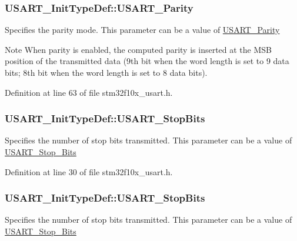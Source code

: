 \subsubsection[{\texorpdfstring{U\+S\+A\+R\+T\+\_\+\+Parity}{USART_Parity}}]{ U\+S\+A\+R\+T\+\_\+\+Init\+Type\+Def\+::\+U\+S\+A\+R\+T\+\_\+\+Parity}\hypertarget{struct_u_s_a_r_t___init_type_def_a5ae66aba755bac37c5cf0dfbf529e2ed}{}\label{struct_u_s_a_r_t___init_type_def_a5ae66aba755bac37c5cf0dfbf529e2ed}
Specifies the parity mode. This parameter can be a value of \hyperlink{group___u_s_a_r_t___parity}{U\+S\+A\+R\+T\+\_\+\+Parity} \begin{DoxyNote}{Note}
When parity is enabled, the computed parity is inserted at the M\+SB position of the transmitted data (9th bit when the word length is set to 9 data bits; 8th bit when the word length is set to 8 data bits). 
\end{DoxyNote}


Definition at line 63 of file stm32f10x\+\_\+usart.\+h.

\subsubsection[{\texorpdfstring{U\+S\+A\+R\+T\+\_\+\+Stop\+Bits}{USART_StopBits}}]{ U\+S\+A\+R\+T\+\_\+\+Init\+Type\+Def\+::\+U\+S\+A\+R\+T\+\_\+\+Stop\+Bits}\hypertarget{struct_u_s_a_r_t___init_type_def_af665896ffd0234704ff30fc4df61565f}{}\label{struct_u_s_a_r_t___init_type_def_af665896ffd0234704ff30fc4df61565f}
Specifies the number of stop bits transmitted. This parameter can be a value of \hyperlink{group___u_s_a_r_t___stop___bits}{U\+S\+A\+R\+T\+\_\+\+Stop\+\_\+\+Bits} 

Definition at line 30 of file stm32f10x\+\_\+usart.\+h.

\subsubsection[{\texorpdfstring{U\+S\+A\+R\+T\+\_\+\+Stop\+Bits}{USART_StopBits}}]{ U\+S\+A\+R\+T\+\_\+\+Init\+Type\+Def\+::\+U\+S\+A\+R\+T\+\_\+\+Stop\+Bits}\hypertarget{struct_u_s_a_r_t___init_type_def_ac745bceb79a6c4c2640fd8e8ce6639d6}{}\label{struct_u_s_a_r_t___init_type_def_ac745bceb79a6c4c2640fd8e8ce6639d6}
Specifies the number of stop bits transmitted. This parameter can be a value of \hyperlink{group___u_s_a_r_t___stop___bits}{U\+S\+A\+R\+T\+\_\+\+Stop\+\_\+\+Bits} 

